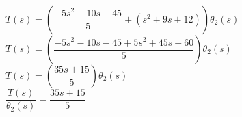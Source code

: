 \documentclass[11pt,letterpaper]{article}
\begin{document}
					$T(s)=\left(\dfrac{-5s^2-10s-45}{5}+(s^2+9s+12)\right)\theta_2(s)$\\

					$T(s)=\left(\dfrac{-5s^2-10s-45+5s^2+45s+60}{5}\right)\theta_2(s)$\\

					$T(s)=\left(\dfrac{35s+15}{5}\right)\theta_2(s)$\\

					$\dfrac{T(s)}{\theta_2(s)}=\dfrac{35s+15}{5}$\\

					\\
\end{document}
